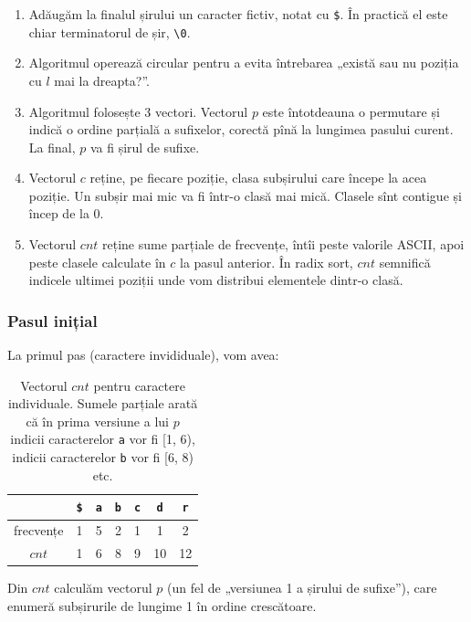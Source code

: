 \documentclass[../main.tex]{subfiles}
\begin{document}
\begin{enumerate}
  \item Adăugăm la finalul șirului un caracter fictiv, notat cu \texttt{\$}. În practică el este chiar terminatorul de șir, \texttt{\textbackslash0}.

  \item Algoritmul operează circular pentru a evita întrebarea „există sau nu poziția cu $l$ mai la dreapta?”.

  \item Algoritmul folosește 3 vectori. Vectorul $p$ este întotdeauna o permutare și indică o ordine parțială a sufixelor, corectă pînă la lungimea pasului curent. La final, $p$ va fi șirul de sufixe.

  \item Vectorul $c$ reține, pe fiecare poziție, clasa subșirului care începe la acea poziție. Un subșir mai mic va fi într-o clasă mai mică. Clasele sînt contigue și încep de la 0.

  \item Vectorul $cnt$ reține sume parțiale de frecvențe, întîi peste valorile ASCII, apoi peste clasele calculate în $c$ la pasul anterior. În radix sort, $cnt$ semnifică indicele ultimei poziții unde vom distribui elementele dintr-o clasă.
\end{enumerate}

\subsubsection*{Pasul inițial}

La primul pas (caractere invididuale), vom avea:

\begin{table}[H]
  \centering
  \begin{tabular}{c|cccccc}
    & \texttt{\$} & \texttt{a} & \texttt{b} & \texttt{c} & \texttt{d} & \texttt{r} \\
    \hline
    frecvențe & 1 & 5 & 2 & 1 & 1 & 2 \\
    $cnt$ & 1 & 6 & 8 & 9 & 10 & 12 \\
  \end{tabular}
  \caption{Vectorul $cnt$ pentru caractere individuale. Sumele parțiale arată că în prima versiune a lui $p$ indicii caracterelor \texttt{a} vor fi [1, 6), indicii caracterelor \texttt{b} vor fi [6, 8) etc.}

\end{table}

Din $cnt$ calculăm vectorul $p$ (un fel de „versiunea 1 a șirului de sufixe”), care enumeră subșirurile de lungime 1 în ordine crescătoare.
\end{document}
